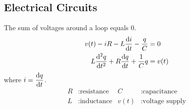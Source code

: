 \documentclass{article}
\begin{document}
\begin{multicols}{3}
    \section*{Electrical Circuits}
    The sum of voltages around a loop equals 0.
    \begin{align*}
        v(t) - iR - L \dv{i}{t} - \frac{q}{C}      & = 0    \\
        L \dv[2]{q}{t} + R\dv{q}{t} + \frac{1}{C}q & = v(t)
    \end{align*}
    where \(\displaystyle i = \dv{q}{t}\).
    \begin{align*}
        R & : \text{resistance} & C    & : \text{capacitance}    \\
        L & : \text{inductance} & v(t) & : \text{voltage supply}
    \end{align*}
\end{multicols}
\end{document}
